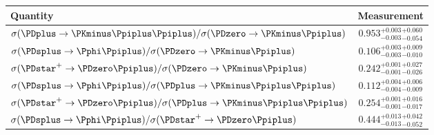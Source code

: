\renewcommand{\arraystretch}{1.3}
\begin{tabular}{lc}
  \toprule
  Quantity                               & Measurement                                    \\
  \midrule
  $\xsec(\DpToKpipi)/\xsec(\DzToKpi)$    & $0.953 ^{+0.003}_{-0.003}$$^{+0.060}_{-0.054}$ \\
  $\xsec(\DspTophipi)/\xsec(\DzToKpi)$   & $0.106 ^{+0.003}_{-0.003}$$^{+0.009}_{-0.010}$ \\
  $\xsec(\DstToDzpi)/\xsec(\DzToKpi)$    & $0.242 ^{+0.001}_{-0.001}$$^{+0.027}_{-0.026}$ \\
  \midrule
  $\xsec(\DspTophipi)/\xsec(\DpToKpipi)$ & $0.112^{+0.004}_{-0.004}$$^{+0.006}_{-0.009}$  \\
  $\xsec(\DstToDzpi)/\xsec(\DpToKpipi)$  & $0.254^{+0.001}_{-0.001}$$^{+0.016}_{-0.017}$  \\
  \midrule
  $\xsec(\DspTophipi)/\xsec(\DstToDzpi)$ & $0.444^{+0.013}_{-0.013}$$^{+0.042}_{-0.052}$  \\
  \bottomrule
\end{tabular}
